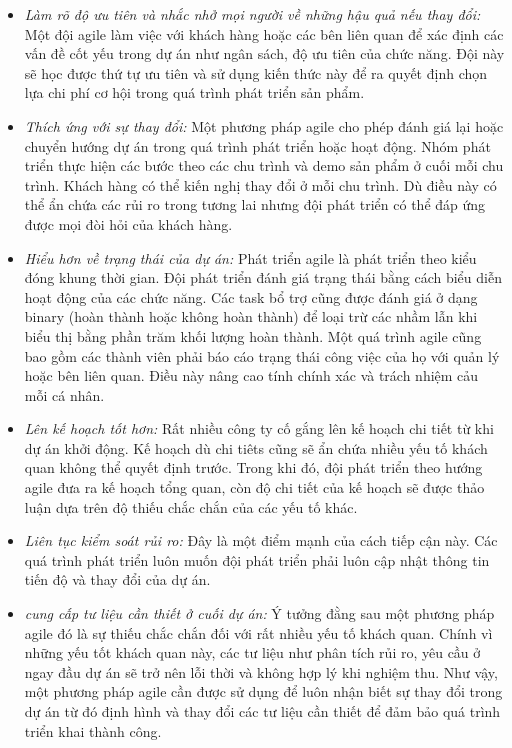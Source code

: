 \documentclass{article}
\begin{document}
\begin{itemize}
	\item \textit{Làm rõ độ ưu tiên và nhắc nhở mọi người về những hậu quả nếu thay đổi:} Một đội agile làm việc với khách hàng hoặc các bên liên quan để xác định các vấn đề cốt yếu trong dự án như ngân sách, độ ưu tiên của chức năng. Đội này sẽ học được thứ tự ưu tiên và sử dụng kiến thức này để ra quyết định chọn lựa chi phí cơ hội trong quá trình phát triển sản phẩm.
	
	\item \textit{Thích ứng với sự thay đổi:} Một phương pháp agile cho phép đánh giá lại hoặc chuyển hướng dự án trong quá trình phát triển hoặc hoạt động. Nhóm phát triển thực hiện các bước theo các chu trình và demo sản phẩm ở cuối mỗi chu trình. Khách hàng có thể kiến nghị thay đổi ở mỗi chu trình. Dù điều này có thể ẩn chứa các rủi ro trong tương lai nhưng đội phát triển có thể đáp ứng được mọi đòi hỏi của khách hàng. 
	
	\item \textit{Hiểu hơn về trạng thái của dự án:} Phát triển agile là phát triển theo kiểu đóng khung thời gian. Đội phát triển đánh giá trạng thái bằng cách biểu diễn hoạt động của các chức năng. Các task bổ trợ cũng được đánh giá ở dạng binary (hoàn thành hoặc không hoàn thành) để loại trừ các nhầm lẫn khi biểu thị bằng phần trăm khối lượng hoàn thành. Một quá trình agile cũng bao gồm các thành viên phải báo cáo trạng thái công việc của họ với quản lý hoặc bên liên quan. Điều này nâng cao tính chính xác và trách nhiệm cảu mỗi cá nhân.
	
	\item \textit{Lên kế hoạch tốt hơn:} Rất nhiều công ty cố gắng lên kế hoạch chi tiết từ khi dự án khởi động. Kế hoạch dù chi tiêts cũng sẽ ẩn chứa nhiều yếu tố khách quan không thể quyết định trước. Trong khi đó, đội phát triển theo hướng agile đưa ra kế hoạch tổng quan, còn độ chi tiết của kế hoạch sẽ được thảo luận dựa trên độ thiếu chắc chắn của các yếu tố khác.
	
	\item \textit{Liên tục kiểm soát rủi ro:} Đây là một điểm mạnh của cách tiếp cận này. Các quá trình phát triển luôn muốn đội phát triển phải luôn cập nhật thông tin tiến độ và thay đổi của dự án. 
	
	\item \textit{cung cấp tư liệu cần thiết ở cuối dự án:} Ý tưởng đằng sau một phương pháp agile đó là sự thiếu chắc chắn đối với rất nhiều yếu tố khách quan. Chính vì những yếu tốt khách quan này, các tư liệu như phân tích rủi ro, yêu cầu ở ngay đầu dự án sẽ trở nên lỗi thời và không hợp lý khi nghiệm thu. Như vậy, một phương pháp agile cần được sử dụng để luôn nhận biết sự thay đổi trong dự án từ đó định hình và thay đổi các tư liệu cần thiết để đảm bảo quá trình triển khai thành công. 
	

\end{itemize}
\end{document}
